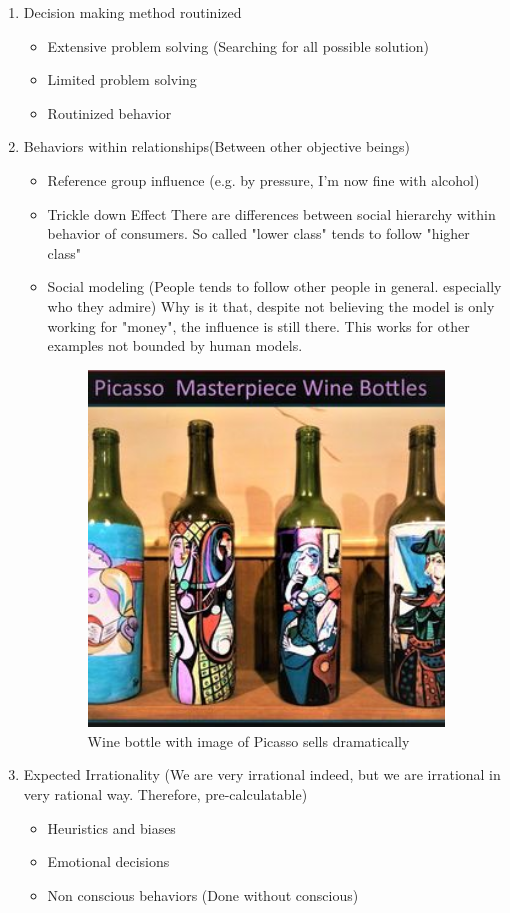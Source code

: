 \documentclass[12pt]{article}
\begin{document}
\begin{enumerate}
	\item Decision making method routinized
	\begin{itemize}
		\item Extensive problem solving (Searching for all possible solution)
		\item Limited problem solving
		\item Routinized behavior
	\end{itemize}
	\item Behaviors within relationships(Between other objective beings)
	\begin{itemize}
		\item Reference group influence (e.g. by pressure, I'm now fine with alcohol)
		\item Trickle down Effect
		There are differences between social hierarchy within behavior of consumers. So called "lower class" tends to follow "higher class"
		\item Social modeling (People tends to follow other people in general. especially who they admire)
		Why is it that, despite not believing the model is only working for "money", the influence is still there. This works for other examples not bounded by human models.
		\begin{figure}[H]
	\centering
	\includegraphics[width=0.95\textwidth]{img/picawine.png}
	\caption{Wine bottle with image of Picasso sells dramatically}
	\label{}
\end{figure}

	\end{itemize}
	\item Expected Irrationality (We are very irrational indeed, but we are irrational in very rational way. Therefore, pre-calculatable)
	\begin{itemize}
		\item Heuristics and biases
		\item  Emotional decisions
		\item Non conscious behaviors (Done without conscious)
	\end{itemize}
\end{enumerate}
\end{document}
